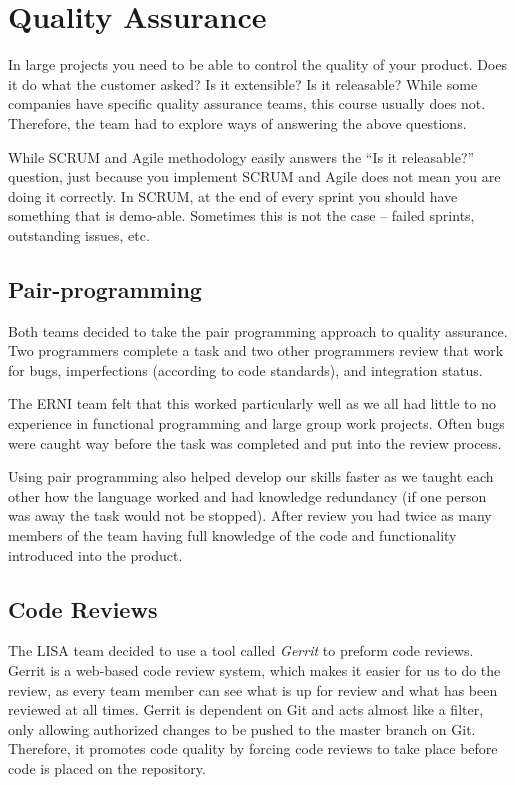 \section {Quality Assurance}
In large projects you need to be able to control the quality of your product. Does it do what the customer asked? Is it extensible? Is it releasable? While some companies have specific quality assurance teams, this  course usually does not. Therefore, the team had to explore ways of answering the above questions.

While SCRUM and Agile methodology easily answers the ``Is it releasable?'' question, just because you implement SCRUM and Agile does not mean you are doing it correctly. In SCRUM, at the end of every sprint you should have something that is demo-able. Sometimes this is not the case -- failed sprints, outstanding issues, etc.

\subsection{Pair-programming}

Both teams decided to take the pair programming approach to quality assurance. Two programmers complete a task and two other programmers review that work for bugs, imperfections (according to code standards), and integration status. 

The ERNI team felt that this worked particularly well as we all had little to no experience in functional programming and large group work projects. Often bugs were caught way before the task was completed and put into the review process. 

Using pair programming also helped develop our skills faster as we taught each other how the language worked and had knowledge redundancy (if one person was away the task would not be stopped). After review you had twice as many members of the team having full knowledge of the code and functionality introduced into the product.

\subsection{Code Reviews}

The LISA team decided to use a tool called \textit{Gerrit} to preform code reviews. Gerrit is a web-based code review system, which makes it easier for us to do the review, as every team member can see what is up for review and what has been reviewed at all times. Gerrit is dependent on Git and acts almost like a filter, only allowing authorized changes to be pushed to the master branch on Git. Therefore, it promotes code quality by forcing code reviews to take place before code is placed on the repository.

